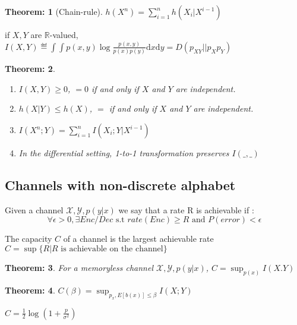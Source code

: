 \documentclass[11pt, a4paper]{scrartcl}
\newtheorem{theorem}{Theorem:}[section]
\newenvironment{definition}[1][Definition]{\begin{trivlist}
\item[\hskip \labelsep {\bfseries #1}]}{\end{trivlist}}
\newenvironment{example}[1][Example]{\begin{trivlist}
\item[\hskip \labelsep {\bfseries #1}]}{\end{trivlist}}
\begin{document}
\begin{theorem}[Chain-rule] $h(X^n) = \sum_{i=1}^n h(X_i|X^{i-1})$ \end{theorem}

\begin{definition}
if $X,Y$ are $\mathbb R$-valued, $I(X,Y) \eqdef \int\int p(x,y) \log \frac {p(x,y)}{p(x)p(y)}\mathrm{d}x\mathrm{d}y = D(p_{XY}||p_X p_Y) $
\end{definition}

\begin{theorem}
\begin{enumerate}
\item  $I(X,Y) \geq 0$, $=0$ if and only if $X$ and $Y$ are independent. 
\item $h(X|Y) \leq h(X)$, $=$ if and only if $X$ and $Y$ are independent. 
\item $I(X^n;Y) =  \sum_{i=1}^n I(X_i;Y|X^{i-1})$
\item In the differential setting, 1-to-1 transformation preserves $I(\_,\_)$
\end{enumerate}
\end{theorem}

\subsection{Channels with non-discrete alphabet}
\begin{definition} Given a channel $\mathcal X, \mathcal Y, p(y|x)$ we say that a rate R is achievable if : 
$$\forall \epsilon >0, \exists Enc/Dec \text{ s.t } rate(Enc) \geq R \text{ and } P(error) < \epsilon $$
\end{definition}

\begin{definition} The capacity $C$ of a channel is the largest achievable rate $C=\sup\{R| R \text{ is achievable on the channel}\}$ 
\end{definition}

\begin{theorem} For a memoryless channel $\mathcal X, \mathcal Y, p(y|x)$, $C = \sup_{p(x)} I(X.Y) $\end{theorem}

\begin{theorem}$ C(\beta) = \sup_{p_x, E[b(x)]\leq \beta} I(X;Y) $\end{theorem}

\begin{example}[Gaussian channel with power constraint] $C=\frac12 \log(1+\frac p{\sigma^2})$ \end{example}
\end{document}
